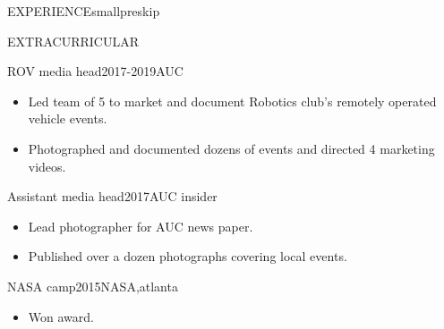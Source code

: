 \documentclass{resume}
\begin{document}
\begin{minipage}[t]{0.44\textwidth}
\begin{rsection}{\MakeUppercase{experience}}{smallpreskip}
	\end{rsection}

	\begin{rsection}{\MakeUppercase{extracurricular}}{}

		\begin{rcontent}{ROV media head}{2017-2019}{AUC}
			\begin{itemize}
				\item Led team of 5 to market and document Robotics club's remotely operated vehicle events.
				\item Photographed and documented dozens of events and directed 4 marketing videos.
			\end{itemize}
		\end{rcontent}
		\divider
		\begin{rcontent}{Assistant media head}{2017}{AUC insider}
			\begin{itemize}
				\item Lead photographer for AUC news paper.
				\item Published over a dozen photographs covering local events.
			\end{itemize}
		\end{rcontent}
		\divider
		\begin{rcontent}{NASA camp}{2015}{NASA,atlanta}
			\begin{itemize}
				\item Won  award.
			\end{itemize}
		\end{rcontent}

	\end{rsection}

\end{minipage}
\end{document}
